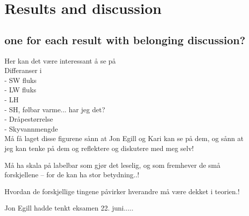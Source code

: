 \chapter{Results and discussion}
\label{chap:results}
\section{one for each result with belonging discussion?}

Her kan det være interessant å se på\\
Differanser i\\
- SW fluks\\
- LW fluks\\
- LH \\
- SH, følbar varme... har jeg det?\\
- Dråpestørrelse\\
- Skyvannmengde\\

Må få laget disse figurene sånn at Jon Egill og Kari kan se på dem, og sånn at jeg kan tenke på dem og reflektere og diskutere med meg selv!

Må ha skala på labelbar som gjør det leselig, og som fremhever de små forskjellene -- for de kan ha stor betydning..!

Hvordan de forskjellige tingene påvirker hverandre må være dekket i teorien.!

Jon Egill hadde tenkt eksamen 22. juni.....